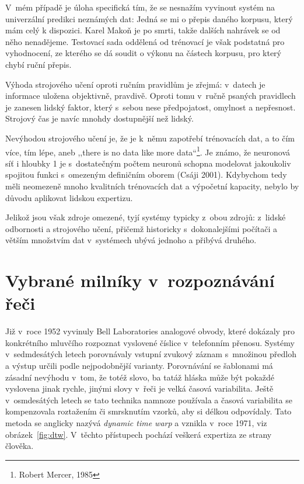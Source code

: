 V~mém případě je úloha specifická tím, že se nesnažím vyvinout systém na
univerzální predikci neznámých dat: Jedná se mi o přepis daného korpusu, který
mám celý k dispozici. Karel Makoň je po smrti, takže dalších nahrávek se od něho
nenadějeme. Testovací sada oddělená od trénovací je však podstatná pro
vyhodnocení, ze kterého se dá soudit o výkonu na částech korpusu, pro který
chybí ruční přepis.

Výhoda strojového učení oproti ručním pravidlům je zřejmá: v~datech je informace
uložena objektivně, pravdivě. Oproti tomu v~ručně psaných pravidlech je zanesen
lidský faktor, který s~sebou nese předpojatost, omylnost a nepřesnost. Strojový
čas je navíc mnohdy dostupnější než lidský.

Nevýhodou strojového učení je, že je k~němu zapotřebí trénovacích dat, a to čím
více, tím lépe, aneb ,,there is no data like more data``\footnote{Robert Mercer,
1985}. Je
známo, že neuronová síť i hloubky 1 je s~dostatečným počtem neuronů schopna
modelovat jakoukoliv spojitou funkci s~omezeným definičním oborem (Csáji
2001)\cite{csaji2001approximation}. Kdybychom tedy měli neomezeně mnoho
kvalitních trénovacích dat a výpočetní kapacity, nebylo by důvodu aplikovat
lidskou expertizu.

Jelikož jsou však zdroje omezené, tyjí systémy typicky z~obou zdrojů: z~lidské
odbornosti a strojového učení, přičemž historicky s~dokonalejšími počítači a
větším množstvím dat v~systémech ubývá jednoho a přibývá druhého.

\section{Vybrané milníky v~rozpoznávání řeči}

Již v~roce 1952 vyvinuly Bell Laboratories analogové obvody, které dokázaly pro
konkrétního mluvčího rozpoznat vyslovené číslice v~telefonním
přenosu.\cite{davis1952automatic}
Systémy v~sedmdesátých letech porovnávaly vstupní zvukový záznam
s~množinou předloh a výstup určili podle nejpodobnější
varianty\cite{huang2014historical}.
Porovnávání se šablonami má zásadní nevýhodu v~tom, že totéž slovo, ba tatáž
hláska může být pokaždé vyslovena jinak rychle, jinými slovy v~řeči je velká
časová variabilita. Ještě v~osmdesátých letech se tato technika namnoze
používala a časová variabilita se kompenzovala roztažením či smrsknutím vzorků,
aby si délkou odpovídaly. Tato metoda se anglicky nazývá \textit{dynamic time
warp} a vznikla v~roce 1971\cite{sakoe1971chiba}, viz obrázek~\ref{fig:dtw}.
V~těchto přístupech pochází veškerá expertiza ze strany člověka.

